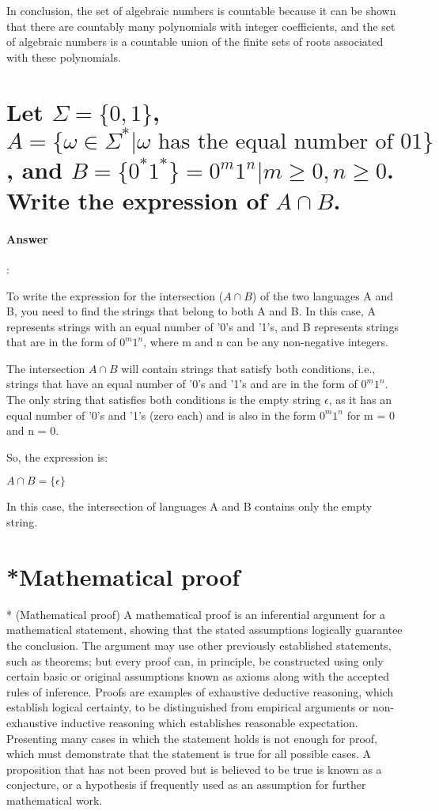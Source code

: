 \documentclass{article}
\begin{document}
In conclusion, the set of algebraic numbers is countable because it can be shown that there are countably many polynomials with integer coefficients, and the set of algebraic numbers is a countable union of the finite sets of roots associated with these polynomials.

\section{Let $\Sigma = \{0, 1\}$, $A = \{\omega \in \Sigma ^* | \omega \text{ has the equal number of 01}\}$, and $B = \{0^*1^*\} = {0^m1^n | m \geq 0, n \geq 0}$. Write the expression of $A \cap  B$.}

\paragraph{Answer}:

To write the expression for the intersection ($A \cap B$) of the two languages A and B, you need to find the strings that belong to both A and B. In this case, A represents strings with an equal number of '0's and '1's, and B represents strings that are in the form of $0^m1^n$, where m and n can be any non-negative integers.

The intersection $A \cap B$ will contain strings that satisfy both conditions, i.e., strings that have an equal number of '0's and '1's and are in the form of $0^m1^n$. The only string that satisfies both conditions is the empty string $\epsilon$, as it has an equal number of '0's and '1's (zero each) and is also in the form $0^m1^n$ for m = 0 and n = 0.

So, the expression is:

$A \cap  B = \{\epsilon\}$

In this case, the intersection of languages A and B contains only the empty string.

\section{*Mathematical proof}

* (Mathematical proof) A mathematical proof is an inferential argument for a mathematical statement, showing that the stated assumptions logically guarantee the conclusion. The argument may use other previously established statements, such as theorems; but every proof can, in principle, be constructed using only certain basic or original assumptions known as axioms along with the accepted rules of inference. Proofs are examples of exhaustive deductive reasoning, which establish logical certainty, to be distinguished from empirical arguments or non-exhaustive inductive reasoning which establishes reasonable expectation. Presenting many cases in
which the statement holds is not enough for proof, which must demonstrate that the statement is true for all possible cases. A proposition that has not been proved but is believed to be true is known as a conjecture, or a hypothesis if frequently used as an assumption for further mathematical work.
\end{document}
